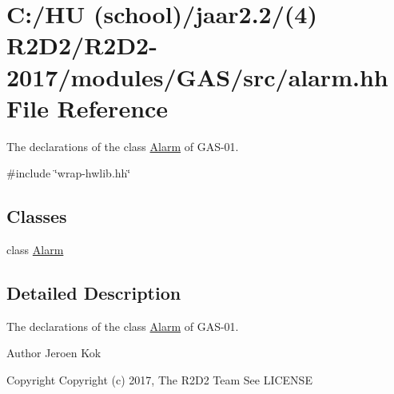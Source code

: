 \hypertarget{alarm_8hh}{}\section{C\+:/\+HU (school)/jaar2.2/(4) R2\+D2/\+R2\+D2-\/2017/modules/\+G\+A\+S/src/alarm.hh File Reference}
\label{alarm_8hh}


The declarations of the class \hyperlink{class_alarm}{Alarm} of G\+A\+S-\/01.  


{\ttfamily \#include \char`\"{}wrap-\/hwlib.\+hh\char`\"{}}\newline
\subsection*{Classes}
\begin{DoxyCompactItemize}
\item 
class \hyperlink{class_alarm}{Alarm}
\end{DoxyCompactItemize}


\subsection{Detailed Description}
The declarations of the class \hyperlink{class_alarm}{Alarm} of G\+A\+S-\/01. 

\begin{DoxyAuthor}{Author}
Jeroen Kok 
\end{DoxyAuthor}
\begin{DoxyCopyright}{Copyright}
Copyright (c) 2017, The R2\+D2 Team  See L\+I\+C\+E\+N\+SE 
\end{DoxyCopyright}
